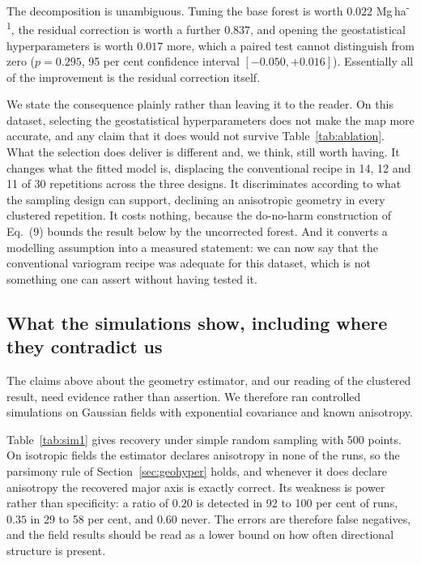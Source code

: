 \documentclass[preprint,12pt,authoryear]{elsarticle}
\newcommand{\Mgha}{Mg\,ha\textsuperscript{-1}}
\begin{document}
\begin{table}[!ht]
\centering
\caption{Decomposition of the improvement under the simple random design, 30
repetitions, $n=500$, RMSE in \Mgha{}. The last two rows differ only in whether
the variogram family, practical range, binning, estimator and anisotropy are
selected out of fold or fixed at the conventional recipe.}
\label{tab:ablation}
\small

\end{table}

The decomposition is unambiguous. Tuning the base forest is worth $0.022$
\Mgha{}, the residual correction is worth a further $0.837$, and opening the
geostatistical hyperparameters is worth $0.017$ more, which a paired test cannot
distinguish from zero (\(p = 0.295\), 95 per cent confidence interval
$[-0.050, +0.016]$). Essentially all of the improvement is the residual
correction itself.

We state the consequence plainly rather than leaving it to the reader. On this
dataset, selecting the geostatistical hyperparameters does not make the map more
accurate, and any claim that it does would not survive Table~\ref{tab:ablation}.
What the selection does deliver is different and, we think, still worth having.
It changes what the fitted model is, displacing the conventional recipe in 14,
12 and 11 of 30 repetitions across the three designs. It discriminates according
to what the sampling design can support, declining an anisotropic geometry in
every clustered repetition. It costs nothing, because the do-no-harm
construction of Eq.~(9) bounds the result below by the uncorrected forest. And
it converts a modelling assumption into a measured statement: we can now say
that the conventional variogram recipe was adequate for this dataset, which is
not something one can assert without having tested it.

\subsection{What the simulations show, including where they contradict us}
\label{sec:sims}

The claims above about the geometry estimator, and our reading of the clustered
result, need evidence rather than assertion. We therefore ran controlled
simulations on Gaussian fields with exponential covariance and known anisotropy.

Table~\ref{tab:sim1} gives recovery under simple random sampling with 500
points. On isotropic fields the estimator declares anisotropy in none of the
runs, so the parsimony rule of Section~\ref{sec:geohyper} holds, and whenever it
does declare anisotropy the recovered major axis is exactly correct. Its
weakness is power rather than specificity: a ratio of $0.20$ is detected in 92
to 100 per cent of runs, $0.35$ in 29 to 58 per cent, and $0.60$ never. The
errors are therefore false negatives, and the field results should be read as a
lower bound on how often directional structure is present.
\end{document}

